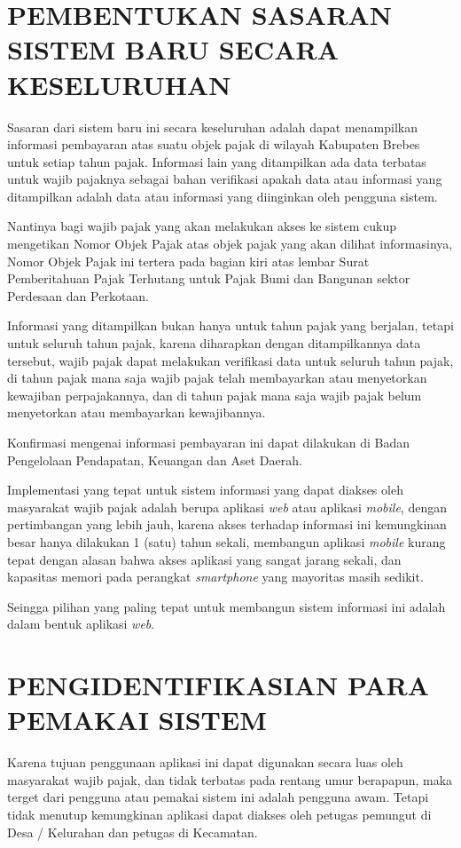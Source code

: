 \documentclass[pdftex,12pt, oneside]{article}
\begin{document}
\section{PEMBENTUKAN SASARAN SISTEM BARU SECARA KESELURUHAN}

Sasaran dari sistem baru ini secara keseluruhan adalah dapat menampilkan informasi pembayaran atas suatu objek pajak di wilayah Kabupaten Brebes untuk setiap tahun pajak. Informasi lain yang ditampilkan ada data terbatas untuk wajib pajaknya sebagai bahan verifikasi apakah data atau informasi yang ditampilkan adalah data atau informasi yang diinginkan oleh pengguna sistem.

Nantinya bagi wajib pajak yang akan melakukan akses ke sistem cukup mengetikan Nomor Objek Pajak atas objek pajak yang akan dilihat informasinya, Nomor Objek Pajak ini tertera pada bagian kiri atas lembar Surat Pemberitahuan Pajak Terhutang untuk Pajak Bumi dan Bangunan sektor Perdesaan dan Perkotaan.

Informasi yang ditampilkan bukan hanya untuk tahun pajak yang berjalan, tetapi untuk seluruh tahun pajak, karena diharapkan dengan ditampilkannya data tersebut, wajib pajak dapat melakukan verifikasi data untuk seluruh tahun pajak, di tahun pajak mana saja wajib pajak telah membayarkan atau menyetorkan kewajiban perpajakannya, dan di tahun pajak mana saja wajib pajak belum menyetorkan atau membayarkan kewajibannya.

Konfirmasi mengenai informasi pembayaran ini dapat dilakukan di Badan Pengelolaan Pendapatan, Keuangan dan Aset Daerah.

Implementasi yang tepat untuk sistem informasi yang dapat diakses oleh masyarakat wajib pajak adalah berupa aplikasi \textit{web} atau aplikasi \textit{mobile}, dengan pertimbangan yang lebih jauh, karena akses terhadap informasi ini kemungkinan besar hanya dilakukan 1 (satu) tahun sekali, membangun aplikasi \textit{mobile} kurang tepat dengan alasan bahwa akses aplikasi yang sangat jarang sekali, dan kapasitas memori pada perangkat \textit{smartphone} yang mayoritas masih sedikit.

Seingga pilihan yang paling tepat untuk membangun sistem informasi ini adalah dalam bentuk aplikasi \textit{web}.

\section{PENGIDENTIFIKASIAN PARA PEMAKAI SISTEM}

Karena tujuan penggunaan aplikasi ini dapat digunakan secara luas oleh masyarakat wajib pajak, dan tidak terbatas pada rentang umur berapapun, maka terget dari pengguna atau pemakai sistem ini adalah pengguna awam. Tetapi tidak menutup kemungkinan aplikasi dapat diakses oleh petugas pemungut di Desa / Kelurahan dan petugas di Kecamatan.
\end{document}
